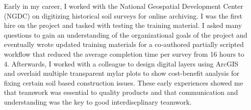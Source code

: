 \documentclass[12pt, letterpaper]{awesome-cv} %
\begin{document}
\begin{cvletter}

Early in my career, I worked with the National Geospatial Development Center (NGDC) on digitizing historical soil surveys for online archiving. I was the first hire on the project and tasked with testing the training material. I asked many questions to gain an understanding of the organizational goals of the project and eventually wrote updated training materials for a co-authored partially scripted workflow that reduced the average completion time per survey from 16 hours to 4. Afterwards, I worked with a colleague to design digital layers using ArcGIS and overlaid multiple transparent mylar plots to show cost-benefit analysis for fixing certain soil based construction issues. These early experiences showed me that teamwork was essential to quality products and that communication and understanding was the key to good interdiscplinary teamwork.


\end{cvletter}
\end{document}
